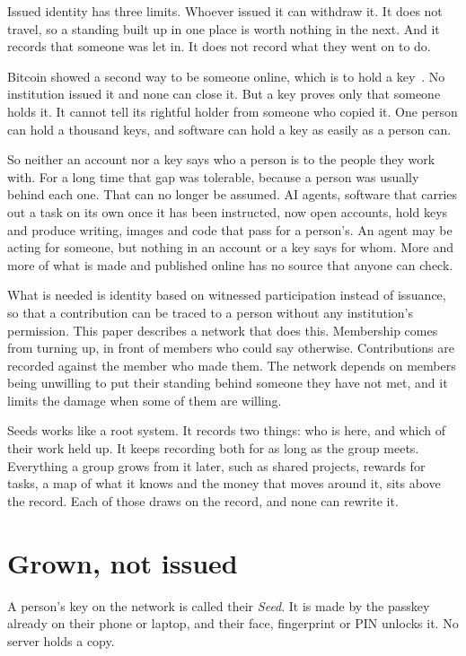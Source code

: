 \documentclass[11pt,a4paper]{article}
\begin{document}
Issued identity has three limits. Whoever issued it can withdraw it. It does not travel, so a standing built up in one place is worth nothing in the next. And it records that someone was let in. It does not record what they went on to do.

Bitcoin showed a second way to be someone online, which is to hold a key~\cite{nakamoto2008}. No institution issued it and none can close it. But a key proves only that someone holds it. It cannot tell its rightful holder from someone who copied it. One person can hold a thousand keys, and software can hold a key as easily as a person can.

So neither an account nor a key says who a person is to the people they work with. For a long time that gap was tolerable, because a person was usually behind each one. That can no longer be assumed. AI agents, software that carries out a task on its own once it has been instructed, now open accounts, hold keys and produce writing, images and code that pass for a person's. An agent may be acting for someone, but nothing in an account or a key says for whom. More and more of what is made and published online has no source that anyone can check.

What is needed is identity based on witnessed participation instead of issuance, so that a contribution can be traced to a person without any institution's permission. This paper describes a network that does this. Membership comes from turning up, in front of members who could say otherwise. Contributions are recorded against the member who made them. The network depends on members being unwilling to put their standing behind someone they have not met, and it limits the damage when some of them are willing.

Seeds works like a root system. It records two things: who is here, and which of their work held up. It keeps recording both for as long as the group meets. Everything a group grows from it later, such as shared projects, rewards for tasks, a map of what it knows and the money that moves around it, sits above the record. Each of those draws on the record, and none can rewrite it.

\section{Grown, not issued}
\label{sec:grown}

A person's key on the network is called their \emph{Seed}. It is made by the passkey already on their phone or laptop, and their face, fingerprint or PIN unlocks it. No server holds a copy.
\end{document}
